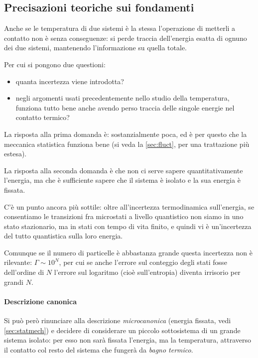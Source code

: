 \subsection{Precisazioni teoriche sui fondamenti}
\label{sec:teorpipterm}
Anche se le temperatura di due sistemi è la stessa l'operazione di metterli a contatto non è senza conseguenze: si perde traccia dell'energia esatta di ognuno dei due sistemi, mantenendo l'informazione su quella totale.

Per cui si pongono due questioni:
\begin{itemize}
	\item quanta incertezza viene introdotta?
	\item negli argomenti usati precedentemente nello studio della temperatura, funziona tutto bene anche avendo perso traccia delle singole energie nel contatto termico?
\end{itemize}

La risposta alla prima domanda è: sostanzialmente poca, ed è per questo che la meccanica statistica funziona bene (si veda la \cref{sec:fluct}, per una trattazione più estesa).

La risposta alla seconda domanda è che non ci serve sapere quantitativamente l'energia, ma che è sufficiente sapere che il sistema è isolato e la sua energia è fissata.
\newline

C'è un punto ancora più sottile: oltre all'incertezza termodinamica sull'energia, se consentiamo le transizioni fra microstati a livello quantistico non siamo in uno stato stazionario, ma in stati con tempo di vita finito, e quindi vi è un'incertezza del tutto quantistica sulla loro energia.

Comunque se il numero di particelle è abbastanza grande questa incertezza non è rilevante: $\Gamma \sim 10^N$, per cui se anche l'errore sul conteggio degli stati fosse dell'ordine di $ N $ l'errore sul logaritmo (cioè sull'entropia) diventa irrisorio per grandi $ N $.

\paragraph{Descrizione canonica} Si può però rinunciare alla descrizione \textit{microcanonica} (energia fissata, vedi \cref{sec:statmech}) e decidere di considerare un piccolo sottosistema di un grande sistema isolato: per esso non sarà fissata l'energia, ma la temperatura, attraverso il contatto col resto del sistema che fungerà da \textit{bagno termico}.

